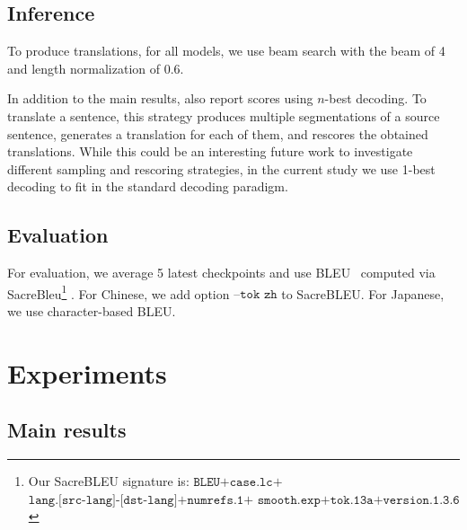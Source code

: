 \documentclass[11pt,a4paper]{article}
\begin{document}
\subsection{Inference}

To produce translations, for all models,  we use beam search with the beam of 4 and length normalization of 0.6.

In addition to the main results, \citet{sentencepiece} also report scores using $n$-best decoding. To translate a sentence, this strategy produces multiple segmentations of a source sentence, generates a translation for each of them, and rescores the obtained translations. While this could be an interesting future work to investigate different sampling and rescoring strategies, in the current study we use 1-best decoding to fit in the standard decoding paradigm.

\subsection{Evaluation}
For evaluation, we average 5 latest checkpoints and use BLEU~\cite{BLEU} computed via SacreBleu\footnote{Our SacreBLEU signature is: $\texttt{BLEU+case.lc+}$ $\texttt{lang.[src-lang]-[dst-lang]+numrefs.1+}$ $\texttt{smooth.exp+tok.13a+version.1.3.6}$} \cite{sacrebleu}. For Chinese, we add option $\texttt{--tok zh}$ to SacreBLEU. For Japanese, we use character-based BLEU. 





\section{Experiments}\label{sec:experiments}

\subsection{Main results}
\label{sect:main_results}
\end{document}
